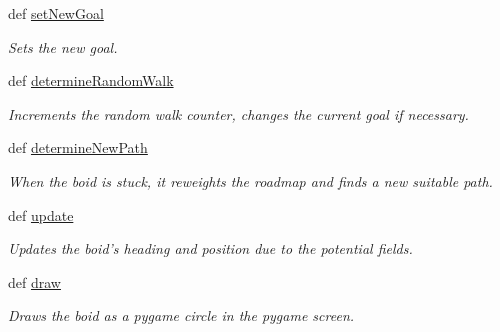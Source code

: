 \begin{DoxyCompactItemize}
def \hyperlink{classboid_1_1Boid_af2f2931c5971a4447cfe179fdafe3ab5}{set\-New\-Goal}
\begin{DoxyCompactList}\small\item\em Sets the new goal. \end{DoxyCompactList}\item 
def \hyperlink{classboid_1_1Boid_ae658dd15bb05b6addce51fba0907709b}{determine\-Random\-Walk}
\begin{DoxyCompactList}\small\item\em Increments the random walk counter, changes the current goal if necessary. \end{DoxyCompactList}\item 
def \hyperlink{classboid_1_1Boid_a47bd5446027d224319a4c71fadc846f2}{determine\-New\-Path}
\begin{DoxyCompactList}\small\item\em When the boid is stuck, it reweights the roadmap and finds a new suitable path. \end{DoxyCompactList}\item 
def \hyperlink{classboid_1_1Boid_a8a354e4b7d58ced69771f3bb5f52d257}{update}
\begin{DoxyCompactList}\small\item\em Updates the boid's heading and position due to the potential fields. \end{DoxyCompactList}\item 
def \hyperlink{classboid_1_1Boid_a289cbbc12cc9c3e7445a5f37b2d88124}{draw}
\begin{DoxyCompactList}\small\item\em Draws the boid as a pygame circle in the pygame screen. \end{DoxyCompactList}\end{DoxyCompactItemize}
